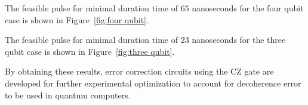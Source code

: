 The feasible pulse for minimal duration time of $65$ nanoseconds for the four qubit case is shown in Figure~\ref{fig:four qubit}.


The feasible pulse for minimal duration time of $23$ nanoseconds for the three qubit case is shown in Figure~\ref{fig:three qubit}.


By obtaining these results, error correction circuits using the CZ gate are developed for further experimental optimization to account for decoherence error to be used in quantum computers.
